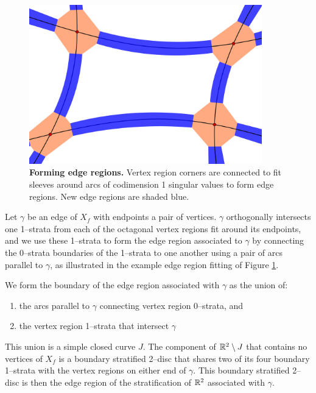 \begin{figure}[h!]
	\centering
	\includegraphics[width=0.9\textwidth]{figures/edge-sleeve.png}
	\caption{
		\textbf{Forming edge regions.}
		Vertex region corners are connected to fit sleeves around arcs of codimension 1 singular values to form edge regions.
		New edge regions are shaded blue.
	}
	\label{fig:edge-sleeve}
\end{figure}

Let $\gamma$ be an edge of $X_f$ with endpoints a pair of vertices.
$\gamma$ orthogonally intersects one 1--strata from each of the octagonal vertex regions fit around its endpoints, and we use these 1--strata to form the edge region associated to $\gamma$ by connecting the 0--strata boundaries of the 1--strata to one another using a pair of arcs parallel to $\gamma$, as illustrated in the example edge region fitting of Figure \ref{fig:edge-sleeve}.

We form the boundary of the edge region associated with $\gamma$ as the union of:
\begin{enumerate}
	\item the arcs parallel to $\gamma$ connecting vertex region 0--strata, and
	\item the vertex region 1--strata that intersect $\gamma$
\end{enumerate}
This union is a simple closed curve $J$.
The component of $\mathbb{R}^2\setminus J$ that contains no vertices of $X_f$ is a boundary stratified 2--disc that shares two of its four boundary 1--strata with the vertex regions on either end of $\gamma$.
This boundary stratified 2--disc is then the edge region of the stratification of $\mathbb{R}^2$ associated with $\gamma$.

